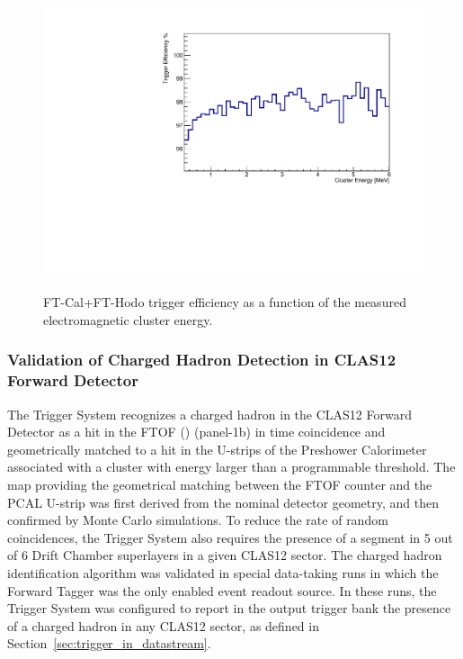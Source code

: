 \begin{figure}[!htb]
 \centering
{\includegraphics[width=.5\textwidth]{img/FT_ClusterEfficiencyHODO.pdf}}
 \caption{FT-Cal+FT-Hodo trigger efficiency as a function of the measured electromagnetic cluster energy.}
 \label{fig:FT_ClusterEfficiencyHODO}
\end{figure}

\subsubsection{Validation of Charged Hadron Detection in CLAS12 Forward Detector}
\label{valid_hadron_forward_detector}

The Trigger System recognizes a charged hadron in the CLAS12 Forward Detector as a hit in the FTOF (\cite{ftof-ref}) (panel-1b) in time coincidence and geometrically matched to a hit in the U-strips of the Preshower Calorimeter \cite{ec-ref} associated with a cluster with energy larger than a programmable threshold. The map providing the geometrical matching between the FTOF counter and the PCAL U-strip was first derived from the nominal detector geometry, and then confirmed by Monte Carlo simulations. To reduce the rate of random coincidences, the Trigger System also requires the presence of a segment in 5 out of 6 Drift Chamber superlayers in a given CLAS12 sector. The charged hadron identification algorithm was validated in special data-taking runs in which the Forward Tagger was the only enabled event readout source. In these runs, the Trigger System was configured to report in the output trigger bank the presence of a charged hadron in any CLAS12 sector, as defined in Section~\ref{sec:trigger_in_datastream}. 


